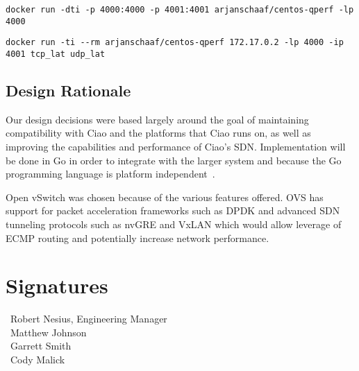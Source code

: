 \documentclass[10pt,onecolumn,journal,draftclsnofoot]{IEEEtran}
\begin{document}
\begin{lstlisting}[caption = Running a qperf docker container in server mode]
docker run -dti -p 4000:4000 -p 4001:4001 arjanschaaf/centos-qperf -lp 4000
\end{lstlisting}

\begin{lstlisting}[caption = Running a qperf docker container in client mode to 
measure TCP and UDP latency]
docker run -ti --rm arjanschaaf/centos-qperf 172.17.0.2 -lp 4000 -ip 4001 tcp_lat udp_lat
\end{lstlisting}

\subsection{Design Rationale}

Our design decisions were based largely around the goal of maintaining
compatibility with Ciao and the platforms that Ciao runs on, as well as
improving the capabilities and performance of Ciao's SDN. Implementation will be
done in Go in order to integrate with the larger system and because the Go
programming language is platform independent~\cite{gogoodfor}.

Open vSwitch was chosen because of the various features offered. OVS has support
for packet acceleration frameworks such as DPDK and advanced SDN tunneling
protocols such as nvGRE and VxLAN which would allow leverage of ECMP routing and
potentially increase network performance.

\clearpage
\section{Signatures}
\vspace{2cm}
\begin{flushleft}
	\noindent\hspace{0.7cm}\makebox[1.5in]{\hrulefill}~Robert Nesius, Engineering Manager\\
	\vspace{1cm}
	\hspace{0.7cm}\makebox[1.5in]{\hrulefill}~Matthew Johnson\\
	\vspace{1cm}
	\hspace{0.7cm}\makebox[1.5in]{\hrulefill}~Garrett Smith\\
	\vspace{1cm}
	\hspace{0.7cm}\makebox[1.5in]{\hrulefill}~Cody Malick
\end{flushleft}
\end{document}
